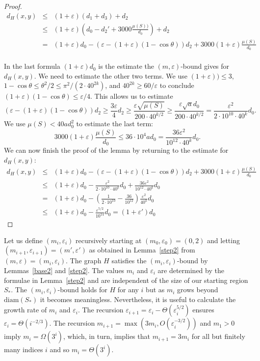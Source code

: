 \documentclass[12pt]{article}
\theoremstyle{plain}
\theoremstyle{definition}
\theoremstyle{remark}
\def\diam{\mathrm{diam}}
\begin{document}
\begin{proof}
\begin{eqnarray*}
d_H(x,y)&\le&(1+\varepsilon)(d_1+d_3)+d_2\\
&\le&(1+\varepsilon)\left(d_0-d_2'+3000\frac{\mu(S))}{d_0}\right)+d_2\\
&=&(1+\varepsilon)d_0-(\varepsilon-(1+\varepsilon)(1-\cos\theta))d_2+3000(1+\varepsilon)\frac{\mu(S)}{d_0}\\
\end{eqnarray*}

In the last formula $(1+\varepsilon)d_0$ is the estimate the $(m,\varepsilon)$-bound gives for $d_H(x,y)$. We need to estimate the other two terms. We use $(1+\varepsilon))\le3$, $1-\cos\theta\le\theta^2/2\le\pi^2/(2\cdot40^{2k})$, and $40^{2k}\ge60/\varepsilon$ to conclude $(1+\varepsilon)(1-\cos\theta)\le \varepsilon/4$. This allows us to estimate
$$(\varepsilon-(1+\varepsilon)(1-\cos\theta))d_2\ge\frac{3\varepsilon}4 d_2\ge\frac{\varepsilon\sqrt{\mu(S)}}{200\cdot40^{k/2}}\ge\frac{\varepsilon\sqrt ad_0}{200\cdot40^{k/2}}=\frac{\varepsilon^2}{2\cdot10^{10}\cdot40^k}d_0.$$
We use $\mu(S)<40ad_0^2$ to estimate the last term:
$$3000(1+\varepsilon)\frac{\mu(S)}{d_0}\le36\cdot10^4ad_0=\frac{36\varepsilon^2}{10^{12}\cdot40^k}d_0.$$
We can now finish the proof of the lemma by returning to the estimate for $d_H(x,y)$:
\begin{eqnarray*}
d_H(x,y)&\le&(1+\varepsilon)d_0-(\varepsilon-(1+\varepsilon)(1-\cos\theta))d_2+3000(1+\varepsilon)\frac{\mu(S)}{d_0}\\
&\le&(1+\varepsilon)d_0-\frac{\varepsilon^2}{2\cdot10^{10}\cdot40^k}d_0+\frac{36\varepsilon^2}{10^{12}\cdot40^k}d_0\\
&=&(1+\varepsilon)d_0-\left(\frac{1}{2\cdot10^{10}}-\frac{36}{10^{12}}\right)\frac{\varepsilon^2}{40^k}d_0\\
&\le&(1+\varepsilon)d_0-\frac{\varepsilon^{5/2}}{10^{14}}d_0=(1+\varepsilon')d_0
\end{eqnarray*}
\end{proof}

Let us define $(m_i,\varepsilon_i)$ recursively starting at $(m_0,\varepsilon_0)=(0,2)$ and letting $(m_{i+1},\varepsilon_{i+1})=(m',\varepsilon')$ as obtained in Lemma~\ref{step2} from $(m,\varepsilon)=(m_i,\varepsilon_i)$. The graph $H$ satisfies the $(m_i,\varepsilon_i)$-bound by Lemmas~\ref{base2} and \ref{step2}. The values $m_i$ and $\varepsilon_i$ are determined by the formulae in Lemma~\ref{step2} and are independent of the size of our starting region $S_*$. The $(m_i,\varepsilon_i)$-bound holds for $H$ for any $i$ but as $m_i$ grows beyond $\diam(S_*)$ it becomes meaningless. Nevertheless, it is useful to calculate the growth rate of $m_i$ and $\varepsilon_i$. The recursion $\varepsilon_{i+1}=\varepsilon_i-\Theta(\varepsilon_i^{5/2})$ ensures $\varepsilon_i=\Theta(i^{-2/3})$. The recursion $m_{i+1}=\max(3m_i,O(\varepsilon_i^{-3/2}))$ and $m_1>0$ imply $m_i=\Omega(3^i)$, which, in turn, implies that $m_{i+1}=3m_i$ for all but finitely many indices $i$ and so $m_i=\Theta(3^i)$.
\end{document}
